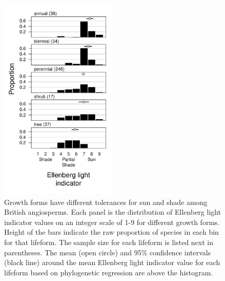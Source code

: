 \documentclass[12pt, oneside]{article}
\begin{document}
\begin{figure}[ht]
\centerline{\includegraphics[width=0.5\textwidth]{figures/figure_gf-light.pdf}}
\caption{Growth forms have different tolerances for sun and shade among British angiosperms. Each panel is the distribution of Ellenberg light indicator values on an integer scale of 1-9 for different growth forms. Height of the bars indicate the raw proportion of species in each bin for that lifeform. The sample size for each lifeform is listed next in parentheses. The mean (open circle) and 95\% confidence intervals (black line) around the mean Ellenberg light indicator value for each lifeform based on phylogenetic regression are above the histogram.} 
\label{fig:gf-light}
\end{figure}
\end{document}

